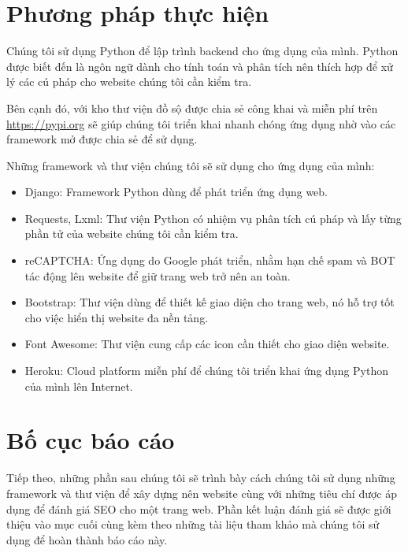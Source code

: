 \section{Phương pháp thực hiện}
Chúng tôi sử dụng Python để lập trình backend cho ứng dụng của mình. Python được biết đến là ngôn ngữ dành cho tính toán và phân tích nên thích hợp để xử lý các cú pháp cho website chúng tôi cần kiểm tra.
\par
Bên cạnh đó, với kho thư viện đồ sộ được chia sẻ công khai và miễn phí trên \url{https://pypi.org} sẽ giúp chúng tôi triển khai nhanh chóng ứng dụng nhờ vào các framework mở được chia sẻ để sử dụng.
\par
Những framework và thư viện chúng tôi sẽ sử dụng cho ứng dụng của mình:
\begin{itemize}
	\item Django: Framework Python dùng để phát triển ứng dụng web.
	\item Requests, Lxml: Thư viện Python có nhiệm vụ phân tích cú pháp và lấy từng phần tử của website chúng tôi cần kiểm tra.
	\item reCAPTCHA: Ứng dụng do Google phát triển, nhằm hạn chế spam và BOT tác động lên website để giữ trang web trở nên an toàn.
	\item Bootstrap: Thư viện dùng để thiết kế giao diện cho trang web, nó hỗ trợ tốt cho việc hiển thị website đa nền tảng.
	\item Font Awesome: Thư viện cung cấp các icon cần thiết cho giao diện website.
	\item Heroku: Cloud platform miễn phí để chúng tôi triển khai ứng dụng Python của mình lên Internet.
\end{itemize}
\section{Bố cục báo cáo}
Tiếp theo, những phần sau chúng tôi sẽ trình bày cách chúng tôi sử dụng những framework và thư viện để xây dựng nên website cùng với những tiêu chí được áp dụng để đánh giá SEO cho một trang web. Phần kết luận đánh giá sẽ được giới thiệu vào mục cuối cùng kèm theo những tài liệu tham khảo mà chúng tôi sử dụng để hoàn thành báo cáo này.